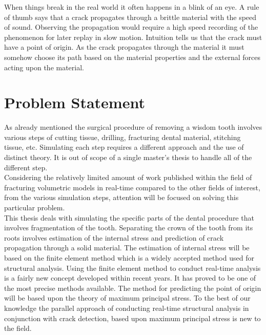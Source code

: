 When things break in the real world it often happens in a blink of an
eye. A rule of thumb says that a crack propagates through a brittle
material with the speed of sound. Observing the propagation would
require a 
high speed recording of the phenomenon for later replay in slow motion.
Intuition tells us that the crack must have a point of origin. As the
crack propagates through the material it must somehow choose its path
based on the material properties and the external forces acting upon
the material. 



\section{Problem Statement}
\label{sec:problem_statement}

As already mentioned the surgical procedure of removing a wisdom tooth
involves various steps of cutting tissue, drilling, fracturing dental
material, stitching tissue, etc. Simulating each step requires a
different approach and the use of distinct theory. It is out of scope
of a single master's thesis to handle all of the different step. \\

%
Considering the relatively limited amount of work published
within the field of fracturing volumetric models in real-time
compared to the other fields of interest, from the various simulation
steps, attention will be focused on solving this particular problem. \\

This thesis deals with simulating the specific parts of the
dental procedure that involves fragmentation of the tooth. Separating the
crown of the tooth from its roots involves estimation of the internal
stress and prediction of crack propagation through a solid material. 
%
The estimation of internal stress will be based on the finite element
method which is a widely accepted method used for structural
analysis. Using the finite element method to conduct real-time
analysis is a fairly new concept developed within recent years. It
has proved to be one of the most precise methods available.
%
The method for predicting the point of origin will be based upon the
theory of maximum principal stress. 
%
To the best of our knowledge the parallel approach of conducting real-time
structural analysis in conjunction with crack detection, based
upon maximum principal stress is new to the field. \\

